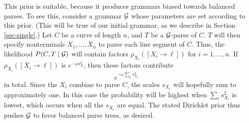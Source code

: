 This prior is suitable, because it produces grammars biased towards
balanced parses. To see this, consider a grammar ${\mathcal G}$ whose
parameters are set according to this prior. (This will be true of our
initial grammar, as we describe in Section \ref{sec-single}.)  Let $C$ be a
curve of length $n$, and $T$ be a ${\mathcal G}$-parse of $C$. $T$ will then
specify nonterminals $X_1,\dots,X_n$ to parse each line segment of
$C$. Thus, the likelihood $P(C,T\mid {\mathcal G})$ will contain factors
$\rho_{X_i}([X_i\to \ell])$ for $i=1,\dots,n$. If $\rho_{X_i}([X_i\to
\ell])$ is $e^{-\omega s_X^2}$, then these factors contribute
$$e^{-\omega \sum_i s_{X_i}^2}$$
in total. Since the $X_i$ combine to parse $C$, the scales $s_{X_i}$
will hopefully sum to approximately one. In this case the probability
will be highest when $\sum_i s_{X_i}^2$ is lowest, which occurs when
all the $s_{X_i}$ are equal. The stated Dirichlet prior thus pushes
${\mathcal G}$ to favor balanced parse trees, as desired.


